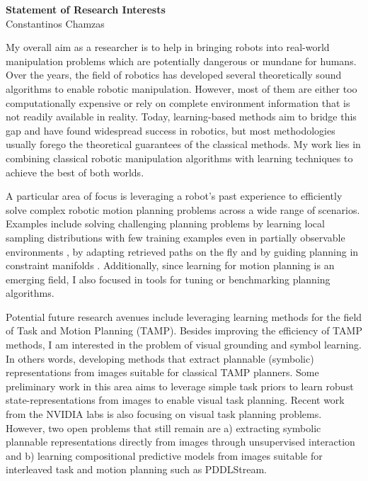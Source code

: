 \documentclass[12pt]{article}
\begin{document}
\begin{center}
  {\large \textbf{Statement of Research Interests}} \\[0.1em]
  {Constantinos Chamzas}
\end{center}

My overall aim as a researcher is to help in bringing robots into real-world manipulation problems which are potentially dangerous or mundane for humans.
Over the years, the field of robotics has developed several theoretically sound algorithms to enable robotic manipulation.
However, most of them are either too computationally expensive or rely on complete environment information that is not readily available in reality. 
Today, learning-based methods aim to bridge this gap and have found widespread success in robotics, but most methodologies usually forego the theoretical guarantees of the classical methods.
My work lies in combining classical robotic manipulation algorithms with learning techniques to achieve the best of both worlds. 

A particular area of focus is leveraging a robot's past experience to efficiently solve complex robotic motion planning problems across a wide range of scenarios.
Examples include solving challenging planning problems by learning local sampling distributions with few training examples \cite{chamzas2019using-local-experiences-for-global-motion-planning} even in partially observable environments \cite{chamzas2021-learn-sampling}, by adapting retrieved paths on the fly \cite{pairet2021-path-planning-for-manipulation} and by guiding planning in constraint manifolds \cite{kingston2021experience-foliations}. Additionally, since learning for motion planning is an emerging field, I also focused in tools
for tuning \cite{moll2021hyperplan} or benchmarking \cite{chamzas2022-motionbenchmaker} planning algorithms. 

Potential future research avenues include leveraging learning methods for the field of Task and Motion Planning (TAMP).
Besides improving the efficiency of TAMP methods, I am interested in the problem of visual grounding and symbol learning.
In others words, developing methods that extract plannable (symbolic) representations from images suitable for classical TAMP planners.
Some preliminary work in this area \cite{chamzas2020rep-learning, chamzas2022-reconstruction} aims to leverage simple task priors to learn robust state-representations from images to enable visual task planning.    
Recent work from the NVIDIA labs \cite{sornet, reactive, nerp, structformer} is also focusing on visual task planning problems. 
However, two open problems that still remain are a) extracting symbolic plannable representations directly from images through unsupervised interaction and b) learning compositional predictive models from images suitable for interleaved task and motion planning such as PDDLStream.   

\vspace{2em}
\footnotesize

\end{document}
